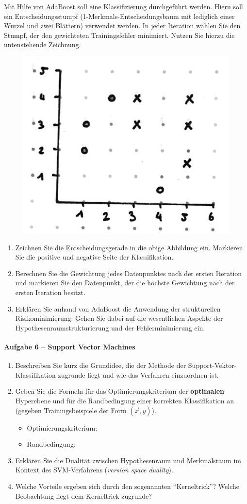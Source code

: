\documentclass[fleqn]{latex-classes/summary}
\begin{document}
Mit Hilfe von AdaBoost soll eine Klassifizierung durchgeführt werden. Hieru soll ein Entscheidungsstumpf (1-Merkmals-Entscheidungsbaum mit lediglich einer Wurzel und zwei Blättern) verwendet werden. In jeder Iteration wählen Sie den Stumpf, der den gewichteten Trainingsfehler minimiert. Nutzen Sie hierzu die untenstehende Zeichnung.

\begin{figure}[H]
  \centering
  \includegraphics[width=.4\linewidth]{assets/img/adaboost.png}
\end{figure}

\begin{enumerate}
  \item Zeichnen Sie die Entscheidungsgerade in die obige Abbildung ein. Markieren Sie die positive und negative Seite der Klassifikation.
  \item Berechnen Sie die Gewichtung jedes Datenpunktes nach der ersten Iteration und markieren Sie den Datenpunkt, der die höchste Gewichtung nach der ersten Iteration besitzt.
  \item Erklären Sie anhand von AdaBoost die Anwendung der strukturellen Risikominimierung. Gehen Sie dabei auf die wesentlichen Aspekte der Hypothesenraumstrukturierung und der Fehlerminimierung ein.
\end{enumerate}

\paragraph{Aufgabe 6 -- Support Vector Machines}

\begin{enumerate}
  \item Beschreiben Sie kurz die Grundidee, die der Methode der Support-Vektor-Klassifikation zugrunde liegt und wie das Verfahren einzuordnen ist.
  \item Geben Sie die Formeln für das Optimierungskriterium der \textbf{optimalen} Hyperebene und für die Randbedingung einer korrekten Klassifikation an (gegeben Trainingsbeispiele der Form \( (\overrightarrow{x}, y) \)).
  \begin{itemize}
    \item Optimierungskriterium:
    \item Randbedingung:
  \end{itemize}
  \item Erklären Sie die Dualität zwischen Hypothesenraum und Merkmalsraum im Kontext des SVM-Verfahrens (\emph{version space duality}).
  \item Welche Vorteile ergeben sich durch den sogenannten ``Kerneltrick''? Welche Beobachtung liegt dem Kerneltrick zugrunde?
\end{enumerate}
\end{document}

